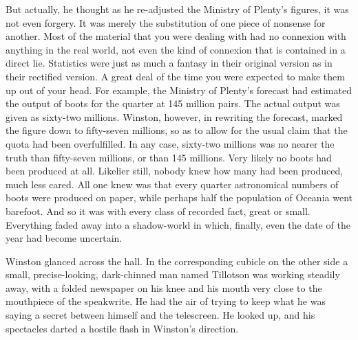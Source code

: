 \documentclass{article}
\begin{document}
But actually, he thought as he re-adjusted the Ministry of Plenty's
figures, it was not even forgery. It was merely the substitution of one
piece of nonsense for another. Most of the material that you were dealing
with had no connexion with anything in the real world, not even the kind of
connexion that is contained in a direct lie. Statistics were just as much
a fantasy in their original version as in their rectified version. A great
deal of the time you were expected to make them up out of your head. For
example, the Ministry of Plenty's forecast had estimated the output of
boots for the quarter at 145 million pairs. The actual output was given as
sixty-two millions. Winston, however, in rewriting the forecast, marked
the figure down to fifty-seven millions, so as to allow for the usual claim
that the quota had been overfulfilled. In any case, sixty-two millions was
no nearer the truth than fifty-seven millions, or than 145 millions. Very
likely no boots had been produced at all. Likelier still, nobody knew
how many had been produced, much less cared. All one knew was that every
quarter astronomical numbers of boots were produced on paper, while perhaps
half the population of Oceania went barefoot. And so it was with every
class of recorded fact, great or small. Everything faded away into a
shadow-world in which, finally, even the date of the year had become
uncertain.

Winston glanced across the hall. In the corresponding cubicle on the other
side a small, precise-looking, dark-chinned man named Tillotson was working
steadily away, with a folded newspaper on his knee and his mouth very close
to the mouthpiece of the speakwrite. He had the air of trying to keep what
he was saying a secret between himself and the telescreen. He looked up,
and his spectacles darted a hostile flash in Winston's direction.
\end{document}
